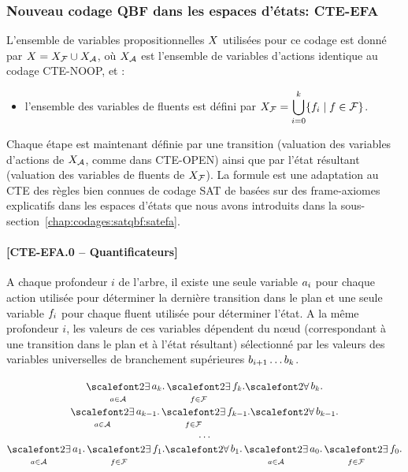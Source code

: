 %
%
\subsubsection{Nouveau codage QBF dans les espaces d'états: CTE-EFA}

L'ensemble de variables propositionnelles $X$ utilisées pour ce codage est donné par $X = X_{\mathcal{F}} \cup X_{\mathcal{A}}$, où $X_{\mathcal{A}}$ est l'ensemble de variables d'actions identique au codage CTE-NOOP, et :
\begin{itemize}
    \item l'ensemble des variables de fluents est défini par $\displaystyle X_{\mathcal{F}}=\bigcup_{i=0}^{k}\{f_{i}\mid f\in\mathcal{F}\}$.
\end{itemize}


Chaque étape est maintenant définie par une transition (valuation des variables d'actions de $X_{\mathcal{A}}$, comme dans CTE-OPEN) ainsi que par l'état résultant (valuation des variables de fluents de $X_{\mathcal{F}}$). La formule est une adaptation au CTE des règles bien connues de codage SAT de \cite{KS92} basées sur des frame-axiomes explicatifs dans les espaces d'états que nous avons introduits dans la sous-section~\ref{chap:codages:satqbf:satefa}.

\paragraph*{[CTE-EFA.0 -- Quantificateurs]}

A chaque profondeur $i$ de l'arbre, il existe une seule variable $a_{i}$ pour chaque action utilisée pour déterminer la dernière transition dans le plan et une seule variable $f_{i}$ pour chaque fluent utilisée pour déterminer l'état.
A la même profondeur $i$, les valeurs de ces variables dépendent du n\oe ud (correspondant à une transition dans le plan et à l'état résultant) sélectionné par les valeurs des variables universelles de branchement supérieures $b_{i+1}\ldots b_{k}$.

\begin{small}
\[
\begin{matrix}
\displaystyle \bigexists_{\a \in \A} \a_{\depth}. \bigexists_{\f\in \F} \f_{\depth}.%
\displaystyle {\bigforall b_{\depth}.}\\
\displaystyle \bigexists_{\a \in \A} \a_{\depth-1}. \bigexists_{\f\in \F} \f_{\depth-1}.%
\displaystyle {\bigforall b_{\depth-1}.}\\
\displaystyle \dots\\ 
\displaystyle \bigexists_{\a \in \A} \a_{1}. \bigexists_{\f\in \F} \f_{1}.%
\displaystyle {\bigforall b_{1}.}%
\displaystyle \bigexists_{\a \in \A} \a_{0}. \bigexists_{\f\in \F} \f_{0}.
\end{matrix}
\]
\end{small}%

